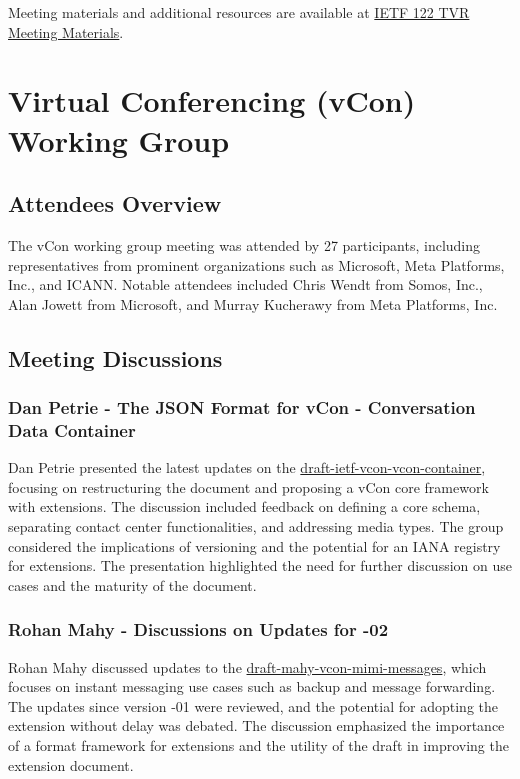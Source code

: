 \documentclass{article}
\begin{document}
Meeting materials and additional resources are available at \href{https://www.ietf.org/proceedings/122/tvr.html}{IETF 122 TVR Meeting Materials}.




\newpage

\section{Virtual Conferencing (vCon) Working Group}

\subsection{Attendees Overview}
The vCon working group meeting was attended by 27 participants, including representatives from prominent organizations such as Microsoft, Meta Platforms, Inc., and ICANN. Notable attendees included Chris Wendt from Somos, Inc., Alan Jowett from Microsoft, and Murray Kucherawy from Meta Platforms, Inc.

\subsection{Meeting Discussions}

\subsubsection{Dan Petrie - The JSON Format for vCon - Conversation Data Container}
Dan Petrie presented the latest updates on the \href{https://datatracker.ietf.org/doc/draft-ietf-vcon-vcon-container/}{draft-ietf-vcon-vcon-container}, focusing on restructuring the document and proposing a vCon core framework with extensions. The discussion included feedback on defining a core schema, separating contact center functionalities, and addressing media types. The group considered the implications of versioning and the potential for an IANA registry for extensions. The presentation highlighted the need for further discussion on use cases and the maturity of the document.

\subsubsection{Rohan Mahy - Discussions on Updates for -02}
Rohan Mahy discussed updates to the \href{https://datatracker.ietf.org/doc/html/draft-mahy-vcon-mimi-messages}{draft-mahy-vcon-mimi-messages}, which focuses on instant messaging use cases such as backup and message forwarding. The updates since version -01 were reviewed, and the potential for adopting the extension without delay was debated. The discussion emphasized the importance of a format framework for extensions and the utility of the draft in improving the extension document.
\end{document}

